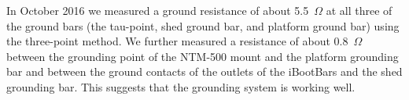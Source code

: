 In October 2016 we measured a ground resistance of about 5.5~$\Omega$ at all three of the ground bars (the tau-point, shed ground bar, and platform ground bar) using the three-point method. We further measured a resistance of about 0.8~$\Omega$ between the grounding point of the NTM-500 mount and the platform grounding bar and between the ground contacts of the outlets of the iBootBars and the shed grounding bar. This suggests that the grounding system is working well.

\fi
